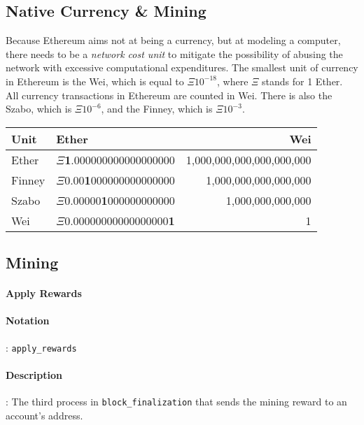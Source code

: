\documentclass[10pt,a4paper,leqno,bibliography=totoc]{scrartcl}
\newenvironment{alphafootnotes}
{\par\edef\savedfootnotenumber{\number\value{footnote}}
\renewcommand{\thefootnote}{\alph{footnote}}
\setcounter{footnote}{0}}
{\par\setcounter{footnote}{\savedfootnotenumber}}
\begin{document}
\begin{alphafootnotes}
\begin{multicols*}{2}
\begin{justify}
	\section{Native Currency \& Mining}
		Because Ethereum aims not at being a currency, but at modeling a computer, there needs to be a \textsl{network cost unit} to mitigate the possibility of abusing the network with excessive computational expenditures. The smallest unit of currency in Ethereum is the Wei, which is equal to $\Xi10^{-18}$, where $\Xi$ stands for 1 Ether. All currency transactions in Ethereum are counted in Wei. There is also the Szabo, which is $\Xi10^{-6}$,  and the Finney, which is $\Xi10^{-3}$. \\ 
	\end{justify}
\raggedright
		\begin{tabular}{llr}
			\toprule
			\textbf{Unit} & \textbf{Ether} & \textbf{Wei} \\
			\midrule
			\scriptsize{Ether} & \scriptsize{$\Xi$\textbf{1}.000000000000000000} & \scriptsize{1,000,000,000,000,000,000} \\
			\scriptsize{Finney} & \scriptsize{$\Xi$0.00\textbf{1}000000000000000} & \scriptsize{1,000,000,000,000,000} \\
			\scriptsize{Szabo} & \scriptsize{$\Xi$0.00000\textbf{1}000000000000} & \scriptsize{1,000,000,000,000} \\
			\scriptsize{Wei} & \scriptsize{$\Xi$0.00000000000000000\textbf{1}} & \scriptsize{1} \\
			\bottomrule
		\end{tabular}
\justify
		\subsection{Mining}
		
				\paragraph{Apply Rewards}
				
				\paragraph{Notation}: \texttt{apply\_rewards} 
				\paragraph{Description}: The third process in \texttt{block\_finalization} that sends the mining reward to an account's address. 
				

\end{multicols*}
\end{alphafootnotes}
\end{document}
